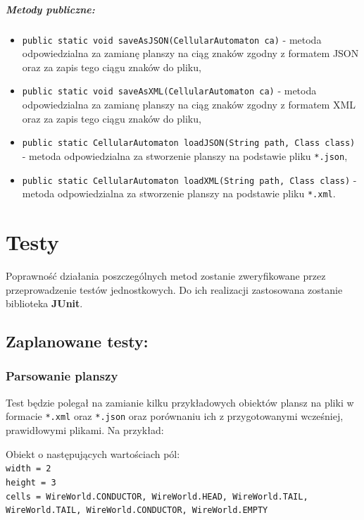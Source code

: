 \documentclass{report}
\begin{document}
\paragraph{Metody publiczne:}
\begin{itemize}
	\item \texttt{public static void saveAsJSON(CellularAutomaton ca)} - metoda odpowiedzialna za zamianę planszy na ciąg znaków zgodny z formatem JSON oraz za zapis tego ciągu znaków do pliku,
	\item \texttt{public static void saveAsXML(CellularAutomaton ca)} - metoda odpowiedzialna za zamianę planszy na ciąg znaków zgodny z formatem XML oraz za zapis tego ciągu znaków do pliku,
	\item \texttt{public static CellularAutomaton loadJSON(String path, Class class)} - metoda odpowiedzialna za stworzenie planszy na podstawie pliku \texttt{*.json},
	\item \texttt{public static CellularAutomaton loadXML(String path, Class class)} - metoda odpowiedzialna za stworzenie planszy na podstawie pliku \texttt{*.xml}.
\end{itemize}



\chapter{Testy}
Poprawność działania poszczególnych metod zostanie zweryfikowane przez przeprowadzenie testów jednostkowych. Do ich realizacji zastosowana zostanie biblioteka \textbf{JUnit}.
\section{Zaplanowane testy:}
\subsection{Parsowanie planszy}

Test będzie polegał na zamianie kilku przykładowych obiektów plansz na pliki w formacie \texttt{*.xml} oraz \texttt{*.json} oraz porównaniu ich z przygotowanymi wcześniej, prawidłowymi plikami. Na przykład:

Obiekt o następujących wartościach pól:\\

\noindent \texttt{width = 2}\\
\texttt{height = 3}\\
\texttt{cells = {WireWorld.CONDUCTOR, WireWorld.HEAD, WireWorld.TAIL, WireWorld.TAIL, WireWorld.CONDUCTOR, WireWorld.EMPTY}}\\
\end{document}
